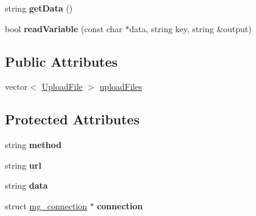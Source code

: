 \begin{DoxyCompactItemize}
\item 
string {\bfseries get\+Data} ()\hypertarget{classMongoose_1_1Request_a43603a53f61e412f90ba9a99391c7fca}{}\label{classMongoose_1_1Request_a43603a53f61e412f90ba9a99391c7fca}

\item 
bool {\bfseries read\+Variable} (const char $\ast$data, string key, string \&output)\hypertarget{classMongoose_1_1Request_a31c3c277344bf81b339480bfa3122d49}{}\label{classMongoose_1_1Request_a31c3c277344bf81b339480bfa3122d49}

\end{DoxyCompactItemize}
\subsection*{Public Attributes}
\begin{DoxyCompactItemize}
\item 
vector$<$ \hyperlink{classMongoose_1_1UploadFile}{Upload\+File} $>$ \hyperlink{classMongoose_1_1Request_aad948dbb01a43ea5f6ca1a0e7bba0ab1}{upload\+Files}
\end{DoxyCompactItemize}
\subsection*{Protected Attributes}
\begin{DoxyCompactItemize}
\item 
string {\bfseries method}\hypertarget{classMongoose_1_1Request_a506a7552c7d3a1dd8ff760f529310cea}{}\label{classMongoose_1_1Request_a506a7552c7d3a1dd8ff760f529310cea}

\item 
string {\bfseries url}\hypertarget{classMongoose_1_1Request_a2acd31b6ab0483df81464c4194917271}{}\label{classMongoose_1_1Request_a2acd31b6ab0483df81464c4194917271}

\item 
string {\bfseries data}\hypertarget{classMongoose_1_1Request_a741bc8dad0ebcb790010229a2f73910e}{}\label{classMongoose_1_1Request_a741bc8dad0ebcb790010229a2f73910e}

\item 
struct \hyperlink{structmg__connection}{mg\+\_\+connection} $\ast$ {\bfseries connection}\hypertarget{classMongoose_1_1Request_ae80e9b502bad19d78af78c62b811549b}{}\label{classMongoose_1_1Request_ae80e9b502bad19d78af78c62b811549b}

\end{DoxyCompactItemize}


